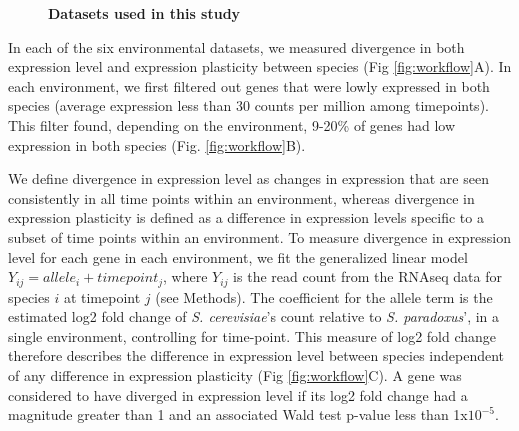\begin{figure}
    \centering
    \caption{\textbf{Datasets used in this study}}
    \label{fig:overview}
\end{figure}

In each of the six environmental datasets, we measured divergence in both expression level and expression plasticity between species (Fig \ref{fig:workflow}A). In each environment, we first filtered out genes that were lowly expressed in both species (average expression less than 30 counts per million among timepoints). This filter found, depending on the environment, 9-20\% of genes had low expression in both species (Fig. \ref{fig:workflow}B).

We define divergence in expression level as changes in expression that are seen consistently in all time points within an environment, whereas divergence in expression plasticity is defined as a difference in expression levels specific to a subset of time points within an environment. To measure divergence in expression level for each gene in each environment, we fit the generalized linear model $Y_{ij} = allele_i + timepoint_j$, where $Y_{ij}$ is the read count from the RNAseq data for species $i$ at timepoint $j$ (see Methods). The coefficient for the allele term is the estimated log2 fold change of \textit{S. cerevisiae}’s count relative to \textit{S. paradoxus}’, in a single environment, controlling for time-point. This measure of log2 fold change therefore describes the difference in expression level between species independent of any difference in expression plasticity (Fig \ref{fig:workflow}C). A gene was considered to have diverged in expression level if its log2 fold change had a magnitude greater than 1 and an associated Wald test p-value less than 1x$10^{-5}$.

